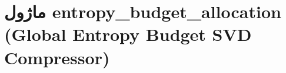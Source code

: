 \section{ماژول entropy\_budget\_allocation (Global Entropy Budget SVD Compressor)}
\label{sec:module_entropy_budget_allocation}
